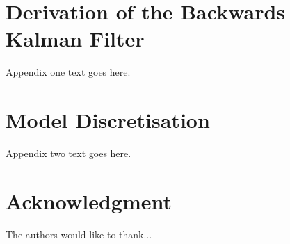 \documentclass[journal]{IEEEtran}
\begin{document}
%


\appendices
\section{Derivation of the Backwards Kalman Filter} \label{app:backward_filter}
Appendix one text goes here.

\section{Model Discretisation} \label{app:model_discretisation}
Appendix two text goes here.


\section*{Acknowledgment}


The authors would like to thank...


\ifCLASSOPTIONcaptionsoff
  \newpage
\fi





%
%
%


\end{document}
